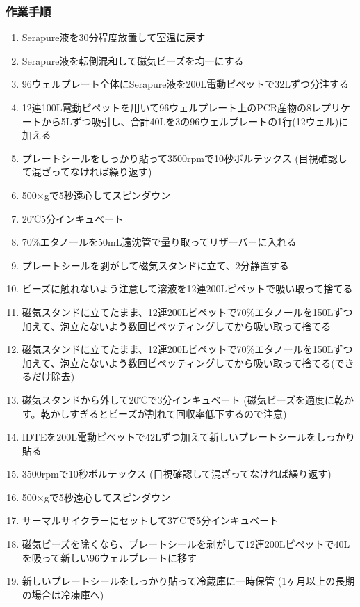 \documentclass[titlepage,10pt,a4paper,uplatex]{jsbook}
\begin{document}
\subsubsection{作業手順}
\begin{enumerate}
\item Serapure液を30分程度放置して室温に戻す
\item Serapure液を転倒混和して磁気ビーズを均一にする
\item 96ウェルプレート全体にSerapure液を200{\textmu}L電動ピペットで32{\textmu}Lずつ分注する
\item 12連100{\textmu}L電動ピペットを用いて96ウェルプレート上のPCR産物の8レプリケートから5{\textmu}Lずつ吸引し、合計40{\textmu}Lを3の96ウェルプレートの1行(12ウェル)に加える
\item プレートシールをしっかり貼って3500rpmで10秒ボルテックス (目視確認して混ざってなければ繰り返す)
\item 500×gで5秒遠心してスピンダウン
\item 20℃5分インキュベート
\item 70\%エタノールを50mL遠沈管で量り取ってリザーバーに入れる
\item プレートシールを剥がして磁気スタンドに立て、2分静置する
\item ビーズに触れないよう注意して溶液を12連200{\textmu}Lピペットで吸い取って捨てる
\item 磁気スタンドに立てたまま、12連200{\textmu}Lピペットで70\%エタノールを150{\textmu}Lずつ加えて、泡立たないよう数回ピペッティングしてから吸い取って捨てる
\item 磁気スタンドに立てたまま、12連200{\textmu}Lピペットで70\%エタノールを150{\textmu}Lずつ加えて、泡立たないよう数回ピペッティングしてから吸い取って捨てる(できるだけ除去)
\item 磁気スタンドから外して20℃で3分インキュベート (磁気ビーズを適度に乾かす。乾かしすぎるとビーズが割れて回収率低下するので注意)
\item IDTEを200{\textmu}L電動ピペットで42{\textmu}Lずつ加えて新しいプレートシールをしっかり貼る
\item 3500rpmで10秒ボルテックス (目視確認して混ざってなければ繰り返す)
\item 500×gで5秒遠心してスピンダウン
\item サーマルサイクラーにセットして37℃で5分インキュベート
\item 磁気ビーズを除くなら、プレートシールを剥がして12連200{\textmu}Lピペットで40{\textmu}Lを吸って新しい96ウェルプレートに移す
\item 新しいプレートシールをしっかり貼って冷蔵庫に一時保管 (1ヶ月以上の長期の場合は冷凍庫へ)
\end{enumerate}
\end{document}
